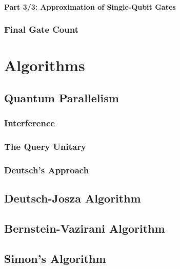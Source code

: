 			\subsubsection{Part 3/3: Approximation of Single-Qubit Gates} %

		\subsection{Final Gate Count} %

\chapter{Algorithms} %

	\section{Quantum Parallelism} %

		\subsection{Interference} %

		\subsection{The Query Unitary} %

		\subsection{Deutsch's Approach} %

	\section{Deutsch-Josza Algorithm} %

	\section{Bernstein-Vazirani Algorithm} %

	\section{Simon's Algorithm} %

